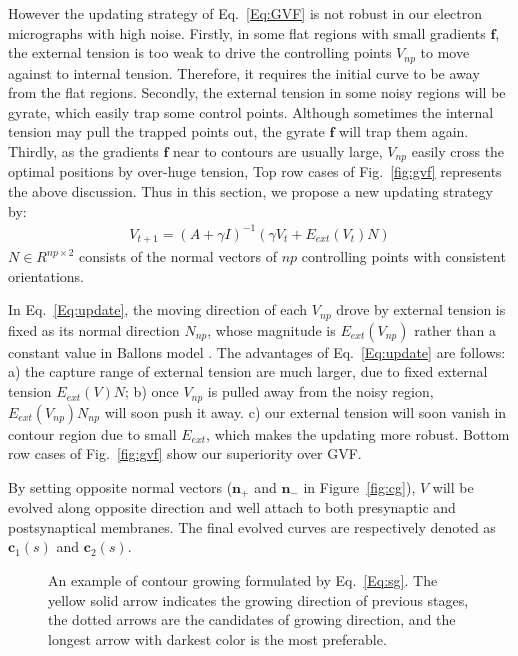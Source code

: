 However the updating strategy of Eq.~\ref{Eq:GVF} is not robust in our electron micrographs with high noise.
Firstly, in some flat regions with small gradients $\mathbf{f}$, the external tension is too weak to drive the controlling points $V_{np}$ to move against to internal tension.
Therefore, it requires the initial curve to be away from the flat regions.
Secondly, the external tension in some noisy regions will be gyrate, which easily trap some control points.
Although sometimes the internal tension may pull the trapped points out, the gyrate $\mathbf{f}$ will trap them again.
Thirdly, as the gradients $\mathbf{f}$ near to contours are usually large, $V_{np}$ easily cross the optimal positions by over-huge tension,
Top row cases of Fig.~\ref{fig:gvf} represents the above discussion.
Thus in this section, we propose a new updating strategy by:
\begin{eqnarray}\label{Eq:update}
V_{t+1} = (A+\gamma I)^{-1}(\gamma V_t+E_{ext}(V_t)N)
\end{eqnarray}
$N\in R^{np\times2}$ consists of the normal vectors of $np$ controlling points with consistent orientations.

In Eq.~\ref{Eq:update}, the moving direction of each $V_{np}$ drove by external tension is fixed as its normal direction $N_{np}$, whose magnitude is $E_{ext}(V_{np})$ rather than a constant value in Ballons model \cite{Cohen1991}.
The advantages of Eq.~\ref{Eq:update} are follows:
a) the capture range of external tension are much larger, due to fixed external tension $E_{ext}(V)N$;
b) once $V_{np}$ is pulled away from the noisy region, $E_{ext}(V_{np})N_{np}$ will soon push it away.
c) our external tension will soon vanish in contour region due to small $E_{ext}$, which makes the updating more robust.
Bottom row cases of Fig.~\ref{fig:gvf} show our superiority over GVF.

By setting opposite normal vectors ($\mathbf{n}_{+}$ and $\mathbf{n}_{-}$ in Figure~\ref{fig:cg}), $V$ will be evolved along opposite direction and well attach to both presynaptic and postsynaptical membranes.
The final evolved curves are respectively denoted as $\mathbf{c}_1(s)$ and $\mathbf{c}_2(s)$.

\begin{figure}[t]
\begin{minipage}[b]{1.0\linewidth}
  \centering
 \centerline{}
\end{minipage}
\caption{An example of contour growing formulated by Eq.~\ref{Eq:sg}.
        The yellow solid arrow indicates the growing direction of previous stages, the dotted arrows are the candidates of growing direction, and the longest arrow with darkest color is the most preferable.}
\label{fig:g}
\end{figure}

